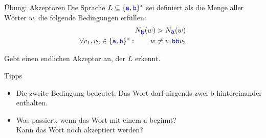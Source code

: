% 













\begin{frame}{Übung: Akzeptoren}
	Die Sprache $L\subseteq \{\hbox{\textcolor{blue}{\texttt{a}}},\hbox{\textcolor{blue}{\texttt{b}}}\}^\ast $ sei definiert als die Menge aller Wörter $w$, die folgende Bedingungen erfüllen:
	\begin{align*}
	N_{\hbox{\textcolor{blue}{\texttt{b}}}}(w) &> N_{\hbox{\textcolor{blue}{\texttt{a}}}}(w)\\ 
	\forall v_1,v_2 \in \{\hbox{\textcolor{blue}{\texttt{a}}},\hbox{\textcolor{blue}{\texttt{b}}}\}^\ast : \qquad w &\neq v_1 \hbox{\textcolor{blue}{\texttt{bb}}} v_2 
	\end{align*}
	
	Gebt einen endlichen Akzeptor an, der $L$ erkennt. \\
	
	\bigskip
	\pause
	\begin{block}{Tipps}
		\begin{itemize}[<+->]
			\item Die zweite Bedingung bedeutet: Das Wort darf nirgends zwei \word b hintereinander enthalten.
			\item Was passiert, wenn das Wort mit einem \word a beginnt?\\
			Kann das Wort noch akzeptiert werden?
		\end{itemize}
	\end{block}
\end{frame}

